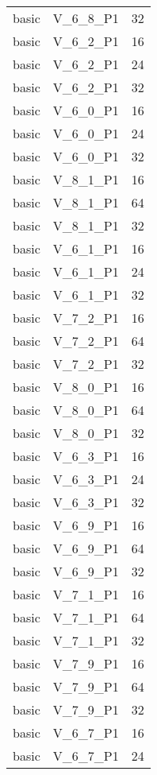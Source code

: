 \begin{longtable}{|c|c|c|}
            basic & V\_6\_8\_P1 & 32 \\
            basic & V\_6\_2\_P1 & 16 \\
            basic & V\_6\_2\_P1 & 24 \\
            basic & V\_6\_2\_P1 & 32 \\
            basic & V\_6\_0\_P1 & 16 \\
            basic & V\_6\_0\_P1 & 24 \\
            basic & V\_6\_0\_P1 & 32 \\
            basic & V\_8\_1\_P1 & 16 \\
            basic & V\_8\_1\_P1 & 64 \\
            basic & V\_8\_1\_P1 & 32 \\
            basic & V\_6\_1\_P1 & 16 \\
            basic & V\_6\_1\_P1 & 24 \\
            basic & V\_6\_1\_P1 & 32 \\
            basic & V\_7\_2\_P1 & 16 \\
            basic & V\_7\_2\_P1 & 64 \\
            basic & V\_7\_2\_P1 & 32 \\
            basic & V\_8\_0\_P1 & 16 \\
            basic & V\_8\_0\_P1 & 64 \\
            basic & V\_8\_0\_P1 & 32 \\
            basic & V\_6\_3\_P1 & 16 \\
            basic & V\_6\_3\_P1 & 24 \\
            basic & V\_6\_3\_P1 & 32 \\
            basic & V\_6\_9\_P1 & 16 \\
            basic & V\_6\_9\_P1 & 64 \\
            basic & V\_6\_9\_P1 & 32 \\
            basic & V\_7\_1\_P1 & 16 \\
            basic & V\_7\_1\_P1 & 64 \\
            basic & V\_7\_1\_P1 & 32 \\
            basic & V\_7\_9\_P1 & 16 \\
            basic & V\_7\_9\_P1 & 64 \\
            basic & V\_7\_9\_P1 & 32 \\
            basic & V\_6\_7\_P1 & 16 \\
            basic & V\_6\_7\_P1 & 24 \\

\end{longtable}
